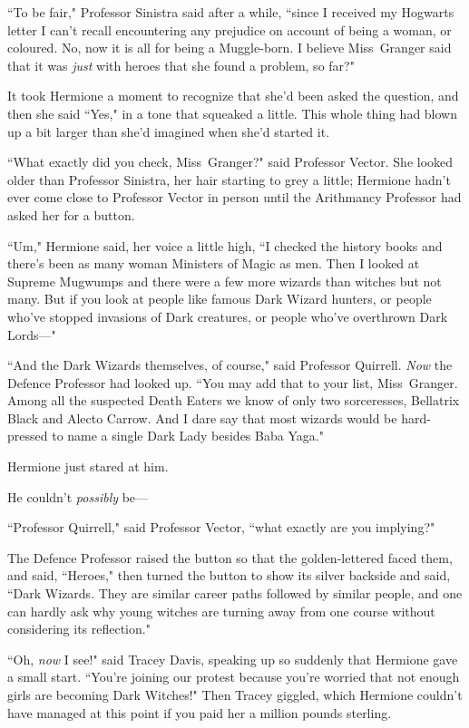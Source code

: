 ``To be fair," Professor Sinistra said after a while, ``since I received my Hogwarts letter I can't recall encountering any prejudice on account of being a woman, or coloured. No, now it is all for being a Muggle-born. I believe Miss~Granger said that it was \emph{just} with heroes that she found a problem, so far?"

It took Hermione a moment to recognize that she'd been asked the question, and then she said ``Yes," in a tone that squeaked a little. This whole thing had blown up a bit larger than she'd imagined when she'd started it.

``What exactly did you check, Miss~Granger?" said Professor Vector. She looked older than Professor Sinistra, her hair starting to grey a little; Hermione hadn't ever come close to Professor Vector in person until the Arithmancy Professor had asked her for a button.

``Um," Hermione said, her voice a little high, ``I checked the history books and there's been as many woman Ministers of Magic as men. Then I looked at Supreme Mugwumps and there were a few more wizards than witches but not many. But if you look at people like famous Dark Wizard hunters, or people who've stopped invasions of Dark creatures, or people who've overthrown Dark Lords—"

``And the Dark Wizards themselves, of course," said Professor Quirrell. \emph{Now} the Defence Professor had looked up. ``You may add that to your list, Miss~Granger. Among all the suspected Death Eaters we know of only two sorceresses, Bellatrix Black and Alecto Carrow. And I dare say that most wizards would be hard-pressed to name a single Dark Lady besides Baba Yaga."

Hermione just stared at him.

He couldn't \emph{possibly} be—

``Professor Quirrell," said Professor Vector, ``what exactly are you implying?"

The Defence Professor raised the button so that the golden-lettered \SPHEW faced them, and said, ``Heroes," then turned the button to show its silver backside and said, ``Dark Wizards. They are similar career paths followed by similar people, and one can hardly ask why young witches are turning away from one course without considering its reflection."

``Oh, \emph{now} I see!" said Tracey Davis, speaking up so suddenly that Hermione gave a small start. ``You're joining our protest because you're worried that not enough girls are becoming Dark Witches!" Then Tracey giggled, which Hermione couldn't have managed at this point if you paid her a million pounds sterling.

